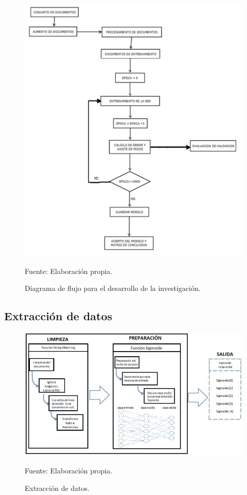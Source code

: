 \begin{figure}[h!]
	\centering
		\includegraphics[scale=0.9]{imagenes/DiagramFlujoPropia.png}
		\caption{Diagrama de flujo para el desarrollo de la investigación.}
	\begin{center}
    Fuente: Elaboración propia.
    \end{center}
	\label{fig:39}
\end{figure}
\newpage
\subsection{Extracción de datos}
\begin{figure}[h!]
	\centering
		\includegraphics[scale=0.5]{imagenes/extradatos.png}
		\caption{Extracción de datos.}
	\begin{center}
    Fuente: Elaboración propia.
    \end{center}
	\label{fig:extracciondedatos}
\end{figure}

